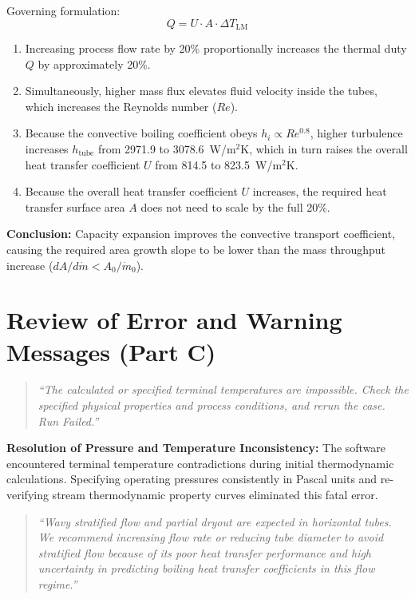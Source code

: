 \documentclass[12pt]{article}
\begin{document}
Governing formulation:
\begin{equation}
Q = U \cdot A \cdot \Delta T_{\text{LM}}
\end{equation}

\begin{enumerate}
\item Increasing process flow rate by 20\% proportionally increases the thermal duty $Q$ by approximately 20\%.
\item Simultaneously, higher mass flux elevates fluid velocity inside the tubes, which increases the Reynolds number ($Re$).
\item Because the convective boiling coefficient obeys $h_i \propto Re^{0.8}$, higher turbulence increases $h_{\text{tube}}$ from 2971.9 to 3078.6~W/m$^2$K, which in turn raises the overall heat transfer coefficient $U$ from 814.5 to 823.5~W/m$^2$K.
\item Because the overall heat transfer coefficient $U$ increases, the required heat transfer surface area $A$ does not need to scale by the full 20\%.
\end{enumerate}

\textbf{Conclusion:} Capacity expansion improves the convective transport coefficient, causing the required area growth slope to be lower than the mass throughput increase ($dA/d\dot{m} < A_0/\dot{m}_0$).


\section{Review of Error and Warning Messages (Part C)}

\begin{quote}
\textit{``The calculated or specified terminal temperatures are impossible. Check the specified physical properties and process conditions, and rerun the case. Run Failed.''}
\end{quote}

\textbf{Resolution of Pressure and Temperature Inconsistency:} The software encountered terminal temperature contradictions during initial thermodynamic calculations. Specifying operating pressures consistently in Pascal units and re-verifying stream thermodynamic property curves eliminated this fatal error.

\begin{quote}
\textit{``Wavy stratified flow and partial dryout are expected in horizontal tubes. We recommend increasing flow rate or reducing tube diameter to avoid stratified flow because of its poor heat transfer performance and high uncertainty in predicting boiling heat transfer coefficients in this flow regime.''}
\end{quote}
\end{document}
